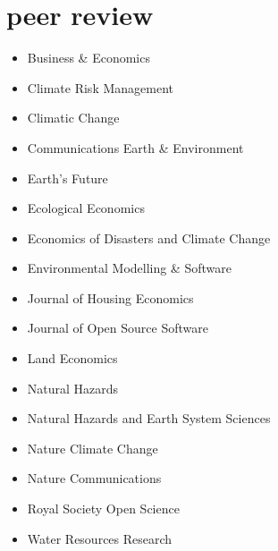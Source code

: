 \documentclass[10pt,oneside]{article}
\begin{document}

\section{peer review}

\mbox{}\vspace{-\dimexpr\baselineskip\relax}

\begin{itemize}[label={}]
  
    \item Business \& Economics
  
    \item Climate Risk Management
  
    \item Climatic Change
  
    \item Communications Earth \& Environment
  
    \item Earth's Future
  
    \item Ecological Economics
  
    \item Economics of Disasters and Climate Change
  
    \item Environmental Modelling \& Software
  
    \item Journal of Housing Economics
  
    \item Journal of Open Source Software
  
    \item Land Economics
  
    \item Natural Hazards
  
    \item Natural Hazards and Earth System Sciences
  
    \item Nature Climate Change
  
    \item Nature Communications
  
    \item Royal Society Open Science
  
    \item Water Resources Research
  
\end{itemize}
\end{document}
